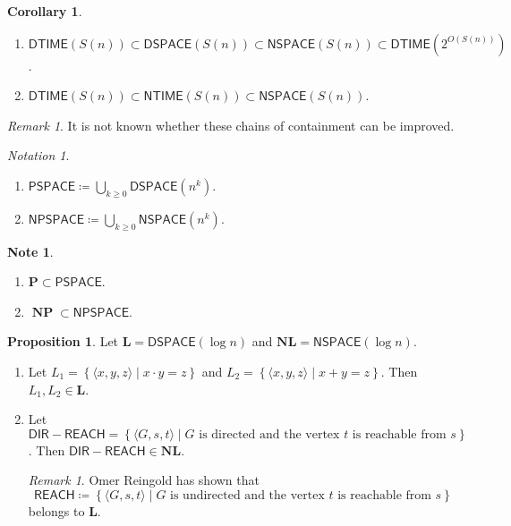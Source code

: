 \documentclass[10pt,letterpaper,cm]{nupset}
\theoremstyle{definition}
\newtheorem{note}[definition]{Note}
\theoremstyle{theorem}
\newtheorem{prop}[definition]{Proposition}
\newtheorem{corollary}[definition]{Corollary}
\theoremstyle{remark}
\newtheorem{remark}[definition]{Remark}
\newtheorem*{notation}{Notation}
\newcommand{\1}{\mathbf{1}}
\newcommand{\0}{\vec 0}
\DeclareMathOperator{\NP}{\mathbf{NP}}
\begin{document}
\begin{corollary} $ $
\begin{enumerate}
\item $\mathsf{DTIME}(S(n)) \subset \mathsf{DSPACE}(S(n)) \subset \mathsf{NSPACE}(S(n)) \subset \mathsf{DTIME}(2^{O(S(n))})$.
\item $\mathsf{DTIME}(S(n)) \subset \mathsf{NTIME}(S(n)) \subset \mathsf{NSPACE}(S(n))$.
\end{enumerate}
\end{corollary}

\begin{remark}
It is not known whether these chains of containment can be improved. 
\end{remark}

\begin{notation} $ $
\begin{enumerate}
\item $\mathsf{PSPACE} \coloneqq \bigcup_{k\geq 0} \mathsf{DSPACE}(n^k)$.
\item $\mathsf{NPSPACE} \coloneqq \bigcup_{k \geq 0} \mathsf{NSPACE}(n^k)$.
\end{enumerate}
\end{notation}

\begin{note} $ $
\begin{enumerate}
\item $\mathbf{P} \subset \mathsf{PSPACE}$.
\item $\NP \subset \mathsf{NPSPACE}$.
\end{enumerate}
\end{note}

\begin{prop}
Let $\mathbf{L} = \mathsf{DSPACE}(\log{n})$ and $\mathbf{NL}= \mathsf{NSPACE}(\log{n})$. 
\begin{enumerate}
\item Let $L_1 = \left\{\langle x,y,z \rangle \mid x \cdot y = z\right\}$ and $L_2 = \left\{\langle x,y,z \rangle \mid x+y = z\right\}$. Then $L_1, L_2 \in \mathbf{L}$.
\item Let $\mathsf{DIR{-}REACH} = \left\{\langle G, s, t \rangle \mid G\text{ is directed and the vertex }t\text{ is reachable from }s\right\}$. Then $\mathsf{DIR{-}REACH}  \in \mathbf{NL}$.
\begin{remark}
Omer Reingold has shown that $$\mathsf{REACH} \coloneqq  \left\{\langle G, s, t \rangle \mid G\text{ is undirected and the vertex }t\text{ is reachable from }s\right\}$$ belongs to $\mathbf{L}$.
\end{remark}
\end{enumerate}
\end{prop}
\end{document}
